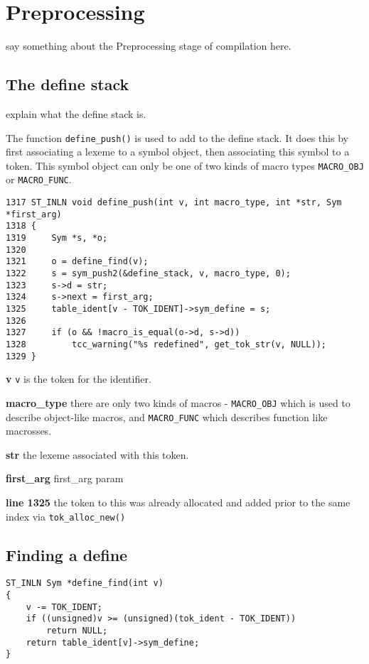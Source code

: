 
\chapter{Preprocessing}

say something about the Preprocessing stage of compilation here.

\section{The define stack}

explain what the define stack is.


The function \verb|define_push()| is used to add to the define stack. It does this by first associating a lexeme to a symbol object, then associating this symbol to a token. This symbol object can only be one of two kinds of macro types \verb|MACRO_OBJ| or \verb|MACRO_FUNC|.


\begin{verbatim}
1317 ST_INLN void define_push(int v, int macro_type, int *str, Sym *first_arg)
1318 {
1319     Sym *s, *o;
1320
1321     o = define_find(v);
1322     s = sym_push2(&define_stack, v, macro_type, 0);
1323     s->d = str;
1324     s->next = first_arg;
1325     table_ident[v - TOK_IDENT]->sym_define = s;
1326 
1327     if (o && !macro_is_equal(o->d, s->d))
1328         tcc_warning("%s redefined", get_tok_str(v, NULL));
1329 }
\end{verbatim}
\begin{tcc_desc}
\textbf{v} \verb|v| is the token for the identifier.

\textbf{macro\_type} there are only two kinds of macros - \verb|MACRO_OBJ| which is used to describe object-like macros, and \verb|MACRO_FUNC| which describes function like macrosses. 

\textbf{str} the lexeme associated with this token.

\textbf{first\_arg} first\_arg param

\textbf{line 1325} the token to this was already allocated and added prior to the same index via \verb|tok_alloc_new()|

\end{tcc_desc}

\section{Finding a define}
\begin{verbatim}
ST_INLN Sym *define_find(int v)
{
    v -= TOK_IDENT;
    if ((unsigned)v >= (unsigned)(tok_ident - TOK_IDENT))
        return NULL;
    return table_ident[v]->sym_define;
}
\end{verbatim}


